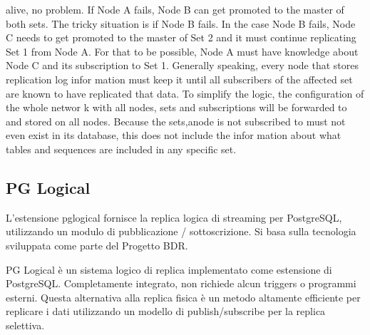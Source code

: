 alive, no problem. If Node A fails, Node B can get promoted to the master of both
sets. The tricky situation is if Node B fails.
In the case Node B fails, Node C needs to get promoted to the master of
Set 2 and it must continue replicating Set 1 from Node A. For that to be possible,
Node A must have knowledge about Node C and its subscription to Set 1. Generally
speaking, every node that stores replication log infor mation must keep it until
all subscribers of the affected set are known to have replicated that data.
To simplify the logic, the configuration of the whole networ k with all nodes,
sets and subscriptions will be forwarded to and stored on all nodes. Because the
sets,anode is not subscribed to must not even exist in its database, this does
not include the infor mation about what tables and sequences are included in any
specific set.


\subsection{PG Logical}
L'estensione pglogical fornisce la replica logica di streaming per PostgreSQL, utilizzando un modulo di pubblicazione / sottoscrizione. Si basa sulla tecnologia sviluppata come parte del Progetto BDR.


PG Logical \`e un sistema logico di replica implementato come estensione di PostgreSQL. Completamente integrato, non richiede alcun triggers o programmi esterni. Questa alternativa alla replica fisica \`e un metodo altamente efficiente per replicare i dati utilizzando un modello di publish/subscribe per la replica selettiva.

